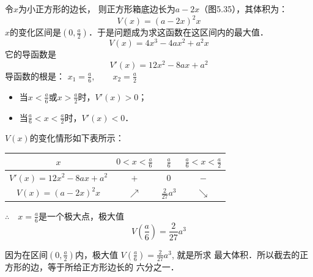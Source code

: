 \begin{figure}[htp]
    \centering

    \caption{}
\end{figure}

\begin{solution}
令$x$为小正方形的边长，
则正方形箱底边长为$a-2x$（图5.35），其体积为：
\[V(x)=(a-2x)^2x\]
$x$的变化区间是$\left(0,\frac{a}{2}\right)$．于是问题成为求这函数在这区间内的最大值．   
\[V(x)=4x^3-4ax^2+a^2x\]
它的导函数是
\[V'(x)=12x^2-8ax+a^2\]
导函数的根是：
$x_1=\frac{a}{6},\qquad x_2=\frac{a}{2}$

\begin{itemize}
    \item 当$x<\frac{a}{6}$或$x>\frac{a}{2}$时，$V'(x)>0$；
    \item 当$\frac{a}{6}<x<\frac{a}{2}$时，$V'(x)<0$．
\end{itemize}
$V(x)$的变化情形如下表所示：
\begin{center}
    \begin{tabular}{c|ccc}
\hline
$x$ & $0<x<\tfrac{a}{6}$&$\tfrac{a}{6}$& $\tfrac{a}{6}<x<\tfrac{a}{2}$\\
\hline
$V'(x)=12x^2-8ax+a^2$ & $+$ &0 &$-$\\
$V(x)=(a-2x)^2x$ &  $\nearrow$& $\tfrac{2}{27}a^3$& $\searrow$\\
\hline
    \end{tabular}
\end{center}
$\therefore\quad x=\frac{a}{6}$是一个极大点，极大值
\[V\left(\frac{a}{6}\right)=\frac{2}{27}a^3\]

因为在区间$\left(0,\frac{a}{2}\right)$内，极大值
$V\left(\frac{a}{6}\right)=\frac{2}{27}a^3$, 就是所求
最大体积．所以截去的正方形的边，等于所给正方形边长的
六分之一．
\end{solution}


